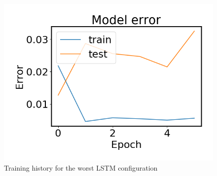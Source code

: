     \begin{figure}
        \begin{minipage}[b]{0.45\linewidth}
            \centering
            \includegraphics[width = \textwidth]{report/figures/analysis/lstm_gridsearch/worst_lstm_error_-1.png}
            \caption{Training history for the worst LSTM configuration}
            \label{fig:lstm_grid_error_best_appendix}
        \end{minipage}
    \end{figure}

             
